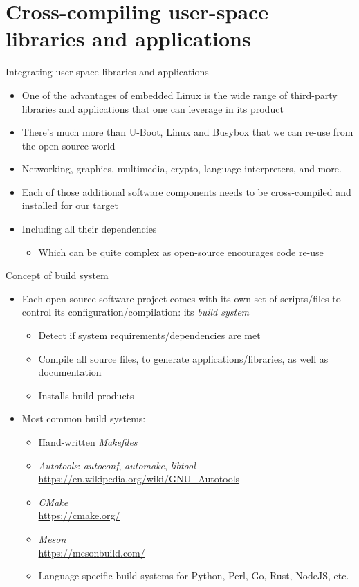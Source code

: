 \section{Cross-compiling user-space libraries and applications}

\begin{frame}{Integrating user-space libraries and applications}
  \begin{itemize}
  \item One of the advantages of embedded Linux is the wide range of
    third-party libraries and applications that one can leverage in
    its product
  \item There's much more than U-Boot, Linux and Busybox that we can
    re-use from the open-source world
  \item Networking, graphics, multimedia, crypto, language
    interpreters, and more.
  \item Each of those additional software components needs to be
    cross-compiled and installed for our target
  \item Including all their dependencies
    \begin{itemize}
    \item Which can be quite complex as open-source encourages code
      re-use
    \end{itemize}
  \end{itemize}
\end{frame}

\begin{frame}{Concept of build system}
  \begin{itemize}
  \item Each open-source software project comes with its own set of
    scripts/files to control its configuration/compilation: its {\em
      build system}
    \begin{itemize}
    \item Detect if system requirements/dependencies are met
    \item Compile all source files, to generate
      applications/libraries, as well as documentation
    \item Installs build products
    \end{itemize}
  \item Most common build systems:
    \begin{itemize}
    \item Hand-written {\em Makefiles}
    \item {\em Autotools}: {\em autoconf}, {\em automake}, {\em libtool}\\
      \url{https://en.wikipedia.org/wiki/GNU_Autotools}
    \item {\em CMake}\\
      \url{https://cmake.org/}
    \item {\em Meson}\\
      \url{https://mesonbuild.com/}
    \item Language specific build systems for Python, Perl, Go, Rust,
      NodeJS, etc.
    \end{itemize}
  \end{itemize}
\end{frame}

